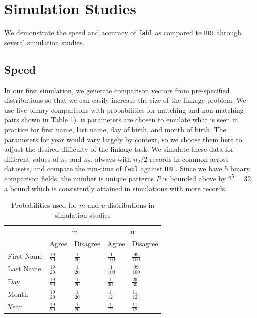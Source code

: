 \documentclass[ba]{imsart}
\begin{document}
	\section{Simulation Studies}
	\label{sec:simulations}
	
	We demonstrate the speed and accuracy of \texttt{fabl} as compared to \texttt{BRL} through several simulation studies. 
	
	\hypertarget{speed}{%
		\subsection{Speed}\label{speed}}
	
	In our first simulation, we generate comparison vectors from pre-specified distributions so that we can easily increase the size of the linkage problem. We use five binary comparisons with probabilities for matching and non-matching pairs shown in Table \ref{Tab:distributions}). $\bm{u}$ parameters are chosen to emulate what is seen in practice for first name, last name, day of birth, and month of birth. The parameters for year would vary largely by context, so we choose them here to adjust the desired difficulty of the linkage task. We simulate these data for different values of \(n_1\) and \(n_2\), always with $n_2/2$ records in common across datasets, and compare the run-time of \texttt{fabl} against \texttt{BRL}. Since we have 5 binary comparison fields, the number is unique patterns \(P\) is bounded above by \(2^5 = 32\), a bound which is consistently attained in simulations with more records. 
	
	\begin{table}[t]
		\centering
		\begin{tabular}{lll|ll}
			\multicolumn{1}{c}{ } & \multicolumn{2}{c}{m} & \multicolumn{2}{c}{u} \\
			\cline{2-3} \cline{4-5}
			& Agree & Disagree & Agree & Disagree \\
			\hline
			First Name & $\frac{19}{20}$ & $\frac{1}{20}$ & $\frac{1}{100}$ &  $\frac{99}{100}$ \\ 
			Last Name & $\frac{19}{20}$ & $\frac{1}{20}$ & $\frac{1}{100}$ &  $\frac{99}{100}$ \\ 
			Day & $\frac{19}{20}$ & $\frac{1}{20}$ & $\frac{1}{30}$ &  $\frac{29}{30}$ \\ 
			Month & $\frac{19}{20}$ & $\frac{1}{20}$ & $\frac{1}{12}$ &  $\frac{11}{12}$ \\ 
			Year & $\frac{19}{20}$ & $\frac{1}{20}$ & $\frac{1}{12}$ &  $\frac{11}{12}$ \\  
			\hline
		\end{tabular}
		\caption{Probabilities used for $m$ and $u$ distributions in simulation studies}\label{Tab:distributions}
	\end{table}
	
\end{document}
